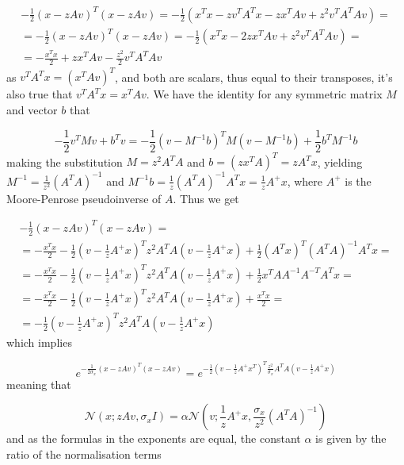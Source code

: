 \documentclass{paper}
\begin{document}
\begin{equation} \label{eq:quad_rearrange}
\begin{split}
-\frac{1}{2} (x-zAv)^T(x-zAv) = -\frac{1}{2} (x^Tx - zv^TA^Tx - zx^TAv + z^2 v^TA^TAv) = \\
= -\frac{1}{2} (x-zAv)^T(x-zAv) = -\frac{1}{2} (x^Tx - 2zx^TAv + z^2 v^TA^TAv) = \\
= -\frac{x^Tx}{2} + zx^TAv -\frac{z^2}{2} v^TA^TAv
\end{split}
\end{equation}
%
as $v^TA^Tx = (x^TAv)^T$, and both are scalars, thus equal to their transposes, it's also true that $v^TA^Tx = x^TAv$. We have the identity for any symmetric matrix $M$ and vector $b$ that

\begin{equation} 
-\frac{1}{2} v^T M v + b^Tv = -\frac{1}{2} (v - M^{-1}b)^T M (v - M^{-1}b) + \frac{1}{2}b^T M^{-1} b
\end{equation}
%
making the substitution $M = z^2A^TA$ and $b = (zx^TA)^T=zA^Tx$, yielding $M^{-1} = \frac{1}{z^2}(A^TA)^{-1}$ and $M^{-1} b = \frac{1}{z}(A^TA)^{-1}A^Tx = \frac{1}{z}A^{+}x$, where $A^{+}$ is the Moore-Penrose pseudoinverse of $A$. Thus we get

\begin{equation}
\begin{split}
-\frac{1}{2} (x-zAv)^T(x-zAv) = \\
= -\frac{x^Tx}{2} -\frac{1}{2} (v - \frac{1}{z}A^{+}x)^T z^2A^TA (v - \frac{1}{z}A^{+}x)  + \frac{1}{2} (A^Tx)^T (A^TA)^{-1}A^Tx = \\
=-\frac{x^Tx}{2} -\frac{1}{2} (v - \frac{1}{z}A^{+}x)^T z^2A^TA (v - \frac{1}{z}A^{+}x)  + \frac{1}{2} x^T A A^{-1} A^{-T} A^T x = \\
= -\frac{x^Tx}{2} -\frac{1}{2} (v - \frac{1}{z}A^{+}x)^T z^2A^TA (v - \frac{1}{z}A^{+}x)  + \frac{x^Tx}{2} = \\
= -\frac{1}{2} (v - \frac{1}{z}A^{+}x)^T z^2A^TA (v - \frac{1}{z}A^{+}x)
\end{split}
\end{equation}
%
which implies

\begin{equation}
e^{-\frac{1}{2 \sigma_x} (x-zAv)^T(x-zAv)} = e^{-\frac{1}{2} (v - \frac{1}{z}A^{+}x^T)^T \frac{z^2}{\sigma_x} A^TA(v - \frac{1}{z}A^{+}x)}
\end{equation}
% 
meaning that

\begin{equation} 
\mathcal{N}(x;zAv,\sigma_x I) = \alpha \mathcal{N}(v;\frac{1}{z}A^{+}x,\frac{\sigma_x}{z^2} (A^TA)^{-1})
\end{equation}
%
and as the formulas in the exponents are equal, the constant  $\alpha$ is given by the ratio of the normalisation terms
\end{document}
